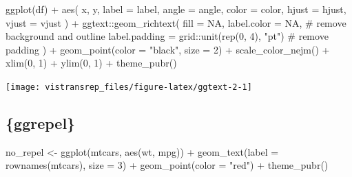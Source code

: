 \documentclass[]{book}
\newenvironment{Shaded}{}{}
\newcommand{\CommentTok}[1]{\textcolor[rgb]{0.00,0.50,0.00}{#1}}
\newcommand{\DataTypeTok}[1]{#1}
\newcommand{\DecValTok}[1]{#1}
\newcommand{\KeywordTok}[1]{\textcolor[rgb]{0.00,0.00,1.00}{#1}}
\newcommand{\NormalTok}[1]{#1}
\newcommand{\OperatorTok}[1]{#1}
\newcommand{\OtherTok}[1]{\textcolor[rgb]{1.00,0.25,0.00}{#1}}
\newcommand{\StringTok}[1]{\textcolor[rgb]{0.00,0.50,0.50}{#1}}
\begin{document}
\begin{Shaded}
\begin{Highlighting}[]
\KeywordTok{ggplot}\NormalTok{(df) }\OperatorTok{+}
\StringTok{  }\KeywordTok{aes}\NormalTok{(}
\NormalTok{    x, y,}
    \DataTypeTok{label =}\NormalTok{ label, }\DataTypeTok{angle =}\NormalTok{ angle, }\DataTypeTok{color =}\NormalTok{ color,}
    \DataTypeTok{hjust =}\NormalTok{ hjust, }\DataTypeTok{vjust =}\NormalTok{ vjust}
\NormalTok{  ) }\OperatorTok{+}
\StringTok{  }\NormalTok{ggtext}\OperatorTok{::}\KeywordTok{geom_richtext}\NormalTok{(}
    \DataTypeTok{fill =} \OtherTok{NA}\NormalTok{, }\DataTypeTok{label.color =} \OtherTok{NA}\NormalTok{, }\CommentTok{# remove background and outline}
    \DataTypeTok{label.padding =}\NormalTok{ grid}\OperatorTok{::}\KeywordTok{unit}\NormalTok{(}\KeywordTok{rep}\NormalTok{(}\DecValTok{0}\NormalTok{, }\DecValTok{4}\NormalTok{), }\StringTok{"pt"}\NormalTok{) }\CommentTok{# remove padding}
\NormalTok{  ) }\OperatorTok{+}
\StringTok{  }\KeywordTok{geom_point}\NormalTok{(}\DataTypeTok{color =} \StringTok{"black"}\NormalTok{, }\DataTypeTok{size =} \DecValTok{2}\NormalTok{) }\OperatorTok{+}
\StringTok{  }\KeywordTok{scale_color_nejm}\NormalTok{() }\OperatorTok{+}
\StringTok{  }\KeywordTok{xlim}\NormalTok{(}\DecValTok{0}\NormalTok{, }\DecValTok{1}\NormalTok{) }\OperatorTok{+}\StringTok{ }\KeywordTok{ylim}\NormalTok{(}\DecValTok{0}\NormalTok{, }\DecValTok{1}\NormalTok{) }\OperatorTok{+}
\StringTok{  }\KeywordTok{theme_pubr}\NormalTok{()}
\end{Highlighting}
\end{Shaded}

\begin{flushright}\texttt{[image: vistransrep\_files/figure-latex/ggtext-2-1]} \end{flushright}

\hypertarget{ggrepel}{%
\subsection{\{ggrepel\}}\label{ggrepel}}

\begin{Shaded}
\begin{Highlighting}[]
\NormalTok{no_repel <-}\StringTok{ }\KeywordTok{ggplot}\NormalTok{(mtcars, }\KeywordTok{aes}\NormalTok{(wt, mpg)) }\OperatorTok{+}
\StringTok{  }\KeywordTok{geom_text}\NormalTok{(}\DataTypeTok{label =} \KeywordTok{rownames}\NormalTok{(mtcars), }\DataTypeTok{size =} \DecValTok{3}\NormalTok{) }\OperatorTok{+}
\StringTok{  }\KeywordTok{geom_point}\NormalTok{(}\DataTypeTok{color =} \StringTok{"red"}\NormalTok{) }\OperatorTok{+}
\StringTok{  }\KeywordTok{theme_pubr}\NormalTok{()}
\end{Highlighting}
\end{Shaded}
\end{document}
